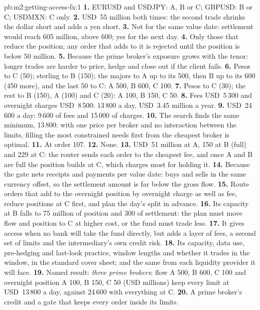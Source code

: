 \begin{solution}{pb:m2:getting-access-fx:1}
\textbf{1.} EURUSD and USDJPY: A, B or C; GBPUSD: B or C; USDMXN: C only.
\textbf{2.} USD~55 million both times: the second trade shrinks the dollar short and adds
a yen short.
\textbf{3.} Not for the same value date: settlement would reach 605 million, above 600;
yes for the next day.
\textbf{4.} Only those that reduce the position; any order that adds to it is rejected
until the position is below 50 million.
\textbf{5.} Because the prime broker's exposure grows with the tenor: longer trades are
harder to price, hedge and close out if the client fails.
\textbf{6.} Pesos to C (50); sterling to B (150); the majors to A up to its 500, then B up
to its 600 (450 more), and the last 50 to C: A 500, B 600, C 100.
\textbf{7.} Pesos to C (30); the rest to B (150), A (100) and C (20): A 100, B 150, C 50.
\textbf{8.} Fees USD~5\,300 and overnight charges USD~8\,500: 13\,800 a day, USD~3.45
million a year.
\textbf{9.} USD~24\,600 a day: 9\,600 of fees and 15\,000 of charges.
\textbf{10.} The search finds the same minimum, 13\,800: with one price per broker and
no interaction between the limits, filling the most constrained needs first from the
cheapest broker is optimal.
\textbf{11.} At order 107.
\textbf{12.} None.
\textbf{13.} USD~51 million at A, 150 at B (full) and 229 at C: the router sends each
order to the cheapest fee, and once A and B are full the position builds at C, which
charges most for holding it.
\textbf{14.} Because the gate nets receipts and payments per value date: buys and sells
in the same currency offset, so the settlement amount is far below the gross flow.
\textbf{15.} Route orders that add to the overnight position by overnight charge as well
as fee, reduce positions at C first, and plan the day's split in advance.
\textbf{16.} Its capacity at B falls to 75 million of position and 300 of settlement:
the plan must move flow and position to C at higher cost, or the fund must trade less.
\textbf{17.} It gives access when no bank will take the fund directly, but adds a layer
of fees, a second set of limits and the intermediary's own credit risk.
\textbf{18.} Its capacity, data use, pre-hedging and last-look practice, window lengths
and whether it trades in the window, in the standard cover sheet; and the same from each
liquidity provider it will face.
\textbf{19.} Named result: \emph{three prime brokers}: flow A 500, B 600, C 100 and
overnight position A 100, B 150, C 50 (USD millions) keep every limit at USD~13\,800 a
day, against 24\,600 with everything at C.
\textbf{20.} A prime broker's credit and a gate that keeps every order inside its limits.
\end{solution}

